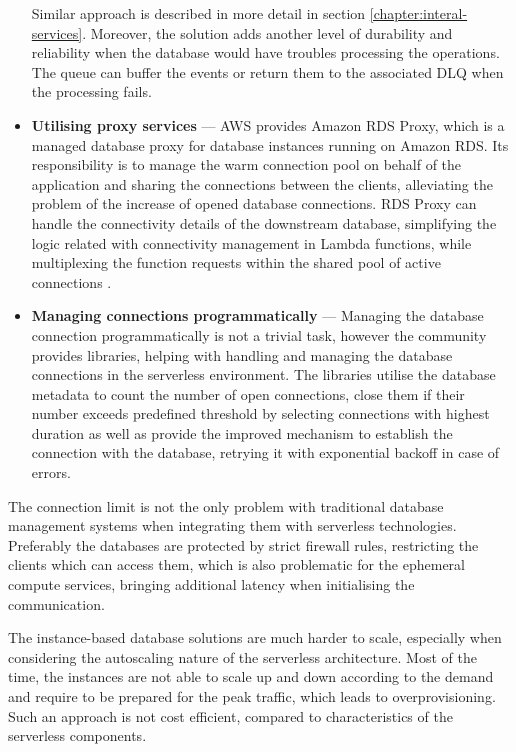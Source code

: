 \begin{itemize}
   Similar approach is described in more detail in section \ref{chapter:interal-services}.
   Moreover, the solution adds another level of durability and reliability when the database would have troubles processing the operations.
   The queue can buffer the events or return them to the associated DLQ when the processing fails.
   \item \textbf{Utilising proxy services} ---
   AWS provides Amazon RDS Proxy, which is a managed database proxy for database instances running on Amazon RDS.
   Its responsibility is to manage the warm connection pool on behalf of the application and sharing the connections between the clients, alleviating the problem of the increase of opened database connections.
   RDS Proxy can handle the connectivity details of the downstream database, simplifying the logic related with connectivity management in Lambda functions, while multiplexing the function requests within the shared pool of active connections \cite{UsingRelationalDatabasesWithAWSLambdaEasyConnectionPooling}.
   \item \textbf{Managing connections programmatically} ---
   Managing the database connection programmatically is not a trivial task, however the community provides libraries, helping with handling and managing the database connections in the serverless environment.
   The libraries utilise the database metadata to count the number of open connections, close them if their number exceeds predefined threshold by selecting connections with highest duration as well as provide the improved mechanism to establish the connection with the database, retrying it with exponential backoff in case of errors.
\end{itemize}

The connection limit is not the only problem with traditional database management systems when integrating them with serverless technologies.
Preferably the databases are protected by strict firewall rules, restricting the clients which can access them, which is also problematic for the ephemeral compute services, bringing additional latency when initialising the communication.

The instance-based database solutions are much harder to scale, especially when considering the autoscaling nature of the serverless architecture.
Most of the time, the instances are not able to scale up and down according to the demand and require to be prepared for the peak traffic, which leads to overprovisioning.
Such an approach is not cost efficient, compared to characteristics of the serverless components.

